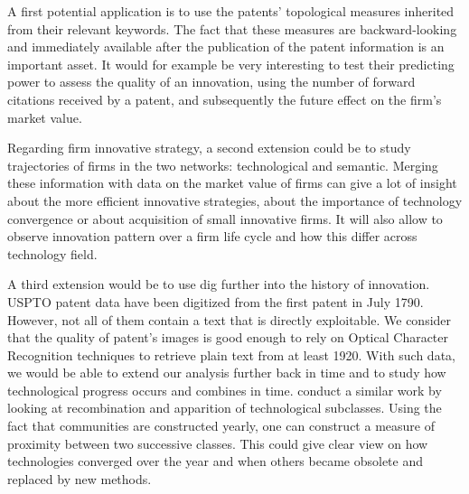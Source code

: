 A first potential application is to use the patents' topological measures inherited from their relevant keywords. The fact that these measures are backward-looking and immediately available after the publication of the patent information is an important asset. It would for example be very interesting to test their predicting power to assess the quality of an innovation, using the number of forward citations received by a patent, and subsequently the future effect on the firm's market value. 

Regarding firm innovative strategy, a second extension could be to study trajectories of firms in the two networks: technological and semantic. Merging these information with data on the market value of firms can give a lot of insight about the more efficient innovative strategies, about the importance of technology convergence or about acquisition of small innovative firms. It will also allow to observe innovation pattern over a firm life cycle and how this differ across technology field.


A third extension would be to use dig further into the history of innovation. USPTO patent data have been digitized from the first patent in July 1790. However, not all of them contain a text that is directly exploitable. We consider that the quality of patent's images is good enough to rely on Optical Character Recognition techniques to retrieve plain text from at least 1920. With such data, we would be able to extend our analysis further back in time and to study how technological progress occurs and combines in time. \cite{akcigit2013mechanics} conduct a similar work by looking at recombination and apparition of technological subclasses.
Using the fact that communities are constructed yearly, one can construct a measure of proximity between two successive classes. This could give clear view on how technologies converged over the year and when others became obsolete and replaced by new methods.








